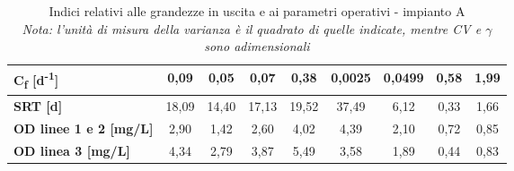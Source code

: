 \begin{sidewaystable}[h]
\begin{center}
\begin{tabular}{lcccccccc}
		\multicolumn{1}{|l|}{\textbf{C\textsubscript{f} {[}d\textsuperscript{-1}{]}}}             & \multicolumn{1}{c|}{0,09}           & \multicolumn{1}{c|}{0,05}                    & \multicolumn{1}{c|}{0,07}             & \multicolumn{1}{c|}{0,38}                    & \multicolumn{1}{c|}{0,0025}            & \multicolumn{1}{c|}{0,0499}            & \multicolumn{1}{c|}{0,58}        & \multicolumn{1}{c|}{1,99}           \\ \hline
		\multicolumn{1}{|l|}{\textbf{SRT {[}d{]}}}              & \multicolumn{1}{c|}{18,09}          & \multicolumn{1}{c|}{14,40}                    & \multicolumn{1}{c|}{17,13}             & \multicolumn{1}{c|}{19,52}                   & \multicolumn{1}{c|}{37,49}             & \multicolumn{1}{c|}{6,12}              & \multicolumn{1}{c|}{0,33}        & \multicolumn{1}{c|}{1,66}           \\ \hline
		\multicolumn{1}{|l|}{\textbf{OD linee 1 e 2 {[}mg/L{]}}}              & \multicolumn{1}{c|}{2,90}          & \multicolumn{1}{c|}{1,42}                    & \multicolumn{1}{c|}{2,60}             & \multicolumn{1}{c|}{4,02}                   & \multicolumn{1}{c|}{4,39}             & \multicolumn{1}{c|}{2,10}              & \multicolumn{1}{c|}{0,72}        & \multicolumn{1}{c|}{0,85}           \\ \hline
		\multicolumn{1}{|l|}{\textbf{OD linea 3 {[}mg/L{]}}}              & \multicolumn{1}{c|}{4,34}          & \multicolumn{1}{c|}{2,79}                    & \multicolumn{1}{c|}{3,87}             & \multicolumn{1}{c|}{5,49}                   & \multicolumn{1}{c|}{3,58}             & \multicolumn{1}{c|}{1,89}              & \multicolumn{1}{c|}{0,44}        & \multicolumn{1}{c|}{0,83}           \\ \hline
	\end{tabular}
\end{center}
	\caption{Indici relativi alle grandezze in uscita e ai parametri operativi - impianto A\\ \textit{Nota: l'unità di misura della varianza è il quadrato di quelle indicate, mentre CV e $\gamma$ sono adimensionali}}
	\label{tab:sa_indici_out_parop}
\end{sidewaystable}




